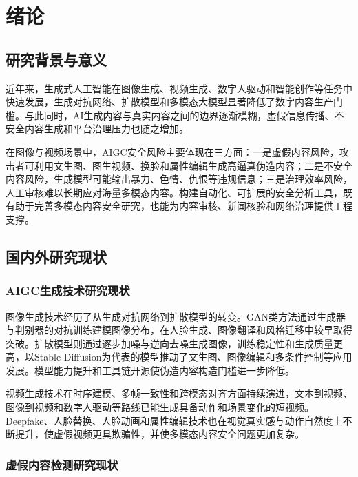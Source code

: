 
\chapter{绪论}

\section{研究背景与意义}

近年来，生成式人工智能在图像生成、视频生成、数字人驱动和智能创作等任务中快速发展，生成对抗网络、扩散模型和多模态大模型显著降低了数字内容生产门槛\cite{ref1,ref4,ref6}。与此同时，AI生成内容与真实内容之间的边界逐渐模糊，虚假信息传播、不安全内容生成和平台治理压力也随之增加。

在图像与视频场景中，AIGC安全风险主要体现在三方面：一是虚假内容风险，攻击者可利用文生图、图生视频、换脸和属性编辑生成高逼真伪造内容；二是不安全内容风险，生成模型可能输出暴力、色情、仇恨等违规信息；三是治理效率风险，人工审核难以长期应对海量多模态内容。构建自动化、可扩展的安全分析工具，既有助于完善多模态内容安全研究，也能为内容审核、新闻核验和网络治理提供工程支撑。

\section{国内外研究现状}

\subsection{AIGC生成技术研究现状}

图像生成技术经历了从生成对抗网络到扩散模型的转变。GAN类方法通过生成器与判别器的对抗训练建模图像分布，在人脸生成、图像翻译和风格迁移中较早取得突破\cite{ref1,ref2,ref3}。扩散模型则通过逐步加噪与逆向去噪生成图像，训练稳定性和生成质量更高，以Stable Diffusion为代表的模型推动了文生图、图像编辑和多条件控制等应用发展\cite{ref4,ref5,ref6,ref7,ref19}。模型能力提升和工具链开源使伪造内容构造门槛进一步降低。

视频生成技术在时序建模、多帧一致性和跨模态对齐方面持续演进，文本到视频、图像到视频和数字人驱动等路线已能生成具备动作和场景变化的短视频。Deepfake、人脸替换、人脸动画和属性编辑技术也在视觉真实感与动作自然度上不断提升，使虚假视频更具欺骗性，并使多模态内容安全问题更加复杂。

\subsection{虚假内容检测研究现状}

